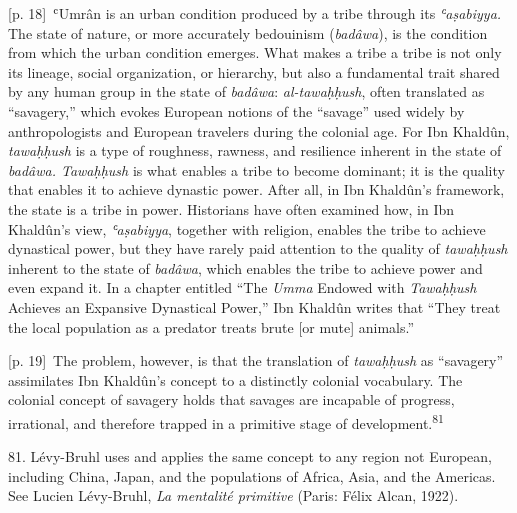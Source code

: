 \documentclass[10pt,a4paper]{article}
\begin{document}
{\scriptsize\color{gray} [p. 18]}\ ʿUmrân is an urban condition produced by a tribe through its \textit{ʿaṣabiyya.} The state of nature, or more accurately bedouinism (\textit{badâwa}), is the condition from which the urban condition emerges. What makes a tribe a tribe is not only its lineage, social organization, or hierarchy, but also a fundamental trait shared by any human group in the state of \textit{badâwa}: \textit{al-tawaḥḥush}, often translated as “savagery,” which evokes European notions of the “savage” used widely by anthropologists and European travelers during the colonial age. For Ibn Khaldûn, \textit{tawaḥḥush} is a type of roughness, rawness, and resilience inherent in the state of \textit{badâwa. Tawaḥḥush} is what enables a tribe to become dominant; it is the quality that enables it to achieve dynastic power. After all, in Ibn Khaldûn’s framework, the state is a tribe in power. Historians have often examined how, in Ibn Khaldûn’s view, \textit{ʿaṣabiyya}, together with religion, enables the tribe to achieve dynastical power, but they have rarely paid attention to the quality of \textit{tawaḥḥush} inherent to the state of \textit{badâwa}, which enables the tribe to achieve power and even expand it. In a chapter entitled “The \textit{Umma} Endowed with \textit{Tawaḥḥush} Achieves an Expansive Dynastical Power,” Ibn Khaldûn writes that “They treat the local population as a predator treats brute [or mute] animals.”\par
{\scriptsize\color{gray} [p. 19]}\ The problem, however, is that the translation of \textit{tawaḥḥush} as “savagery” assimilates Ibn Khaldûn’s concept to a distinctly colonial vocabulary. The colonial concept of savagery holds that savages are incapable of progress, irrational, and therefore trapped in a primitive stage of development.\nobreak\textsuperscript{81}\par{\small 81. Lévy-Bruhl uses and applies the same concept to any region not European, including China, Japan, and the populations of Africa, Asia, and the Americas. See Lucien Lévy-Bruhl, \textit{La mentalité primitive} (Paris: Félix Alcan, 1922).\par}
\end{document}
